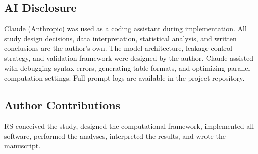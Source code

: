 \documentclass[12pt]{article}
\begin{document}
\subsection{AI Disclosure}

Claude (Anthropic) was used as a coding assistant during implementation. All study design decisions, data interpretation, statistical analysis, and written conclusions are the author's own. The model architecture, leakage-control strategy, and validation framework were designed by the author. Claude assisted with debugging syntax errors, generating table formats, and optimizing parallel computation settings. Full prompt logs are available in the project repository.

\subsection{Author Contributions}

RS conceived the study, designed the computational framework, implemented all software, performed the analyses, interpreted the results, and wrote the manuscript.


\end{document}
